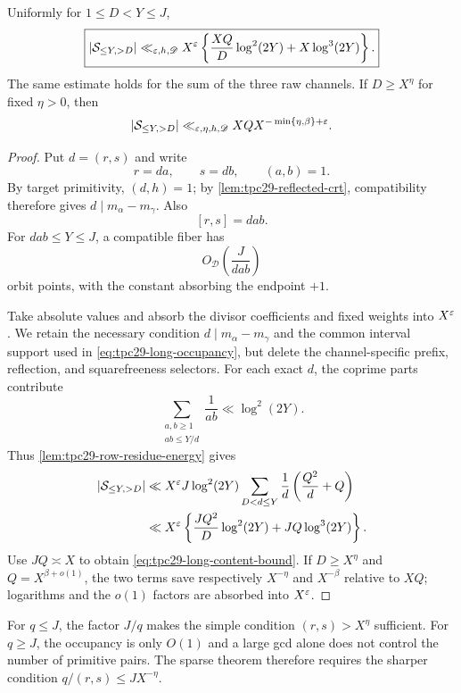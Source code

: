 \begin{theorem}
\label{thm:tpc29-long-content}
Uniformly for $1\le D<Y\le J$,
\begin{equation}
 \boxed{
 |\mathcal S_{\le Y,>D}|
 \ll_{\varepsilon,h,\mathscr D}X^\varepsilon
 \left\{
  \frac{XQ}{D}\log^2(2Y)+X\log^3(2Y)
 \right\}.}
 \label{eq:tpc29-long-content-bound}
\end{equation}
The same estimate holds for the sum of the three raw channels.
If $D\ge X^\eta$ for fixed $\eta>0$, then
\begin{equation}
 |\mathcal S_{\le Y,>D}|
 \ll_{\varepsilon,\eta,h,\mathscr D}
 XQX^{-\min\{\eta,\beta\}+\varepsilon}.
 \label{eq:tpc29-long-content-power}
\end{equation}
\end{theorem}

\begin{proof}
Put $d=(r,s)$ and write
\[
 r=da,\qquad s=db,\qquad(a,b)=1.
\]
By target primitivity, $(d,h)=1$; by
\cref{lem:tpc29-reflected-crt}, compatibility therefore gives
$d\mid m_\alpha-m_\gamma$.  Also
\[
 [r,s]=dab.
\]
For $dab\le Y\le J$, a compatible fiber has
\begin{equation}
 O_{\mathscr D}\left(\frac{J}{dab}\right)
 \label{eq:tpc29-long-occupancy}
\end{equation}
orbit points, with the constant absorbing the endpoint $+1$.

Take absolute values and absorb the divisor coefficients and fixed
weights into $X^\varepsilon$.  We retain the necessary condition
$d\mid m_\alpha-m_\gamma$ and the common interval support used in
\eqref{eq:tpc29-long-occupancy}, but delete the channel-specific
prefix, reflection, and squarefreeness selectors.  For each exact
$d$, the coprime parts contribute
\begin{equation}
 \sum_{\substack{a,b\ge1\\ab\le Y/d}}
 \frac1{ab}
 \ll\log^2(2Y).
 \label{eq:tpc29-harmonic-pairs}
\end{equation}
Thus \cref{lem:tpc29-row-residue-energy} gives
\begin{align}
 |\mathcal S_{\le Y,>D}|
 &\ll X^\varepsilon J\log^2(2Y)
 \sum_{D<d\le Y}\frac1d
 \left(\frac{Q^2}{d}+Q\right)
 \notag\\
 &\ll X^\varepsilon\left\{
  \frac{JQ^2}{D}\log^2(2Y)
  +JQ\log^3(2Y)
 \right\}.
 \label{eq:tpc29-long-content-intermediate}
\end{align}
Use $JQ\asymp X$ to obtain
\eqref{eq:tpc29-long-content-bound}.  If $D\ge X^\eta$ and
$Q=X^{\beta+o(1)}$, the two terms save respectively $X^{-\eta}$ and
$X^{-\beta}$ relative to $XQ$; logarithms and the $o(1)$ factors are
absorbed into $X^\varepsilon$.
\end{proof}

\begin{remark}
\label{rem:tpc29-two-content-conditions}
For $q\le J$, the factor $J/q$ makes the simple condition
$(r,s)>X^\eta$ sufficient.  For $q\ge J$, the occupancy is only
$O(1)$ and a large gcd alone does not control the number of primitive
pairs.  The sparse theorem therefore requires the sharper condition
$q/(r,s)\le JX^{-\eta}$.
\end{remark}
